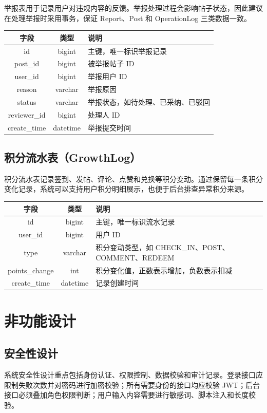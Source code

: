 \documentclass[UTF8,a4paper,12pt]{ctexart}
\begin{document}
举报表用于记录用户对违规内容的反馈。举报处理过程会影响帖子状态，因此建议在处理举报时采用事务，保证 Report、Post 和 OperationLog 三类数据一致。

\begin{longtable}{|c|c|p{7cm}|}
\hline
字段 & 类型 & 说明 \\
\hline
id & bigint & 主键，唯一标识举报记录 \\
post\_id & bigint & 被举报帖子 ID \\
user\_id & bigint & 举报用户 ID \\
reason & varchar & 举报原因 \\
status & varchar & 举报状态，如待处理、已采纳、已驳回 \\
reviewer\_id & bigint & 处理人 ID \\
create\_time & datetime & 举报提交时间 \\
\hline
\end{longtable}

\subsection{积分流水表（GrowthLog）}

积分流水表记录签到、发帖、评论、点赞和兑换等积分变动。通过保留每一条积分变化记录，系统可以支持用户积分明细展示，也便于后台排查异常积分来源。

\begin{longtable}{|c|c|p{7cm}|}
\hline
字段 & 类型 & 说明 \\
\hline
id & bigint & 主键，唯一标识流水记录 \\
user\_id & bigint & 用户 ID \\
type & varchar & 积分变动类型，如 CHECK\_IN、POST、COMMENT、REDEEM \\
points\_change & int & 积分变化值，正数表示增加，负数表示扣减 \\
create\_time & datetime & 记录创建时间 \\
\hline
\end{longtable}

\section{非功能设计}

\subsection{安全性设计}

系统安全性设计重点包括身份认证、权限控制、数据校验和审计记录。登录接口应限制失败次数并对密码进行加密校验；所有需要身份的接口均应校验 JWT；后台接口必须叠加角色权限判断；用户输入内容需要进行敏感词、脚本注入和长度校验。
\end{document}
